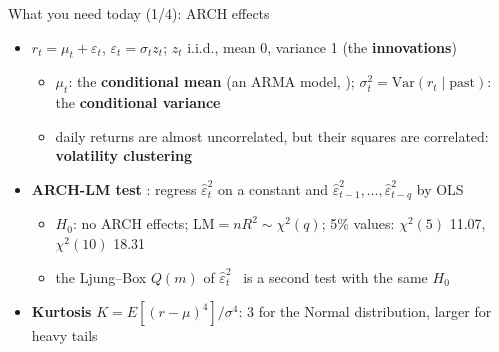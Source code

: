 \begin{frame}{What you need today (1/4): ARCH effects}
\itemsize{\small}
\begin{itemize}
    \item $r_t = \mu_t + \varepsilon_t$, $\varepsilon_t = \sigma_t z_t$; $z_t$ i.i.d., mean 0, variance 1 (the \textbf{innovations})
    \begin{itemize}
        \item $\mu_t$: the \textbf{conditional mean} (an ARMA model, ); $\sigma_t^2 = \mathrm{Var}(r_t \mid \text{past})$: the \textbf{conditional variance}
        \item daily returns are almost uncorrelated, but their squares are correlated: \textbf{volatility clustering}
    \end{itemize}
    \item \textbf{ARCH-LM test} : regress $\hat\varepsilon_t^2$ on a constant and $\hat\varepsilon_{t-1}^2, \dots, \hat\varepsilon_{t-q}^2$ by OLS
    \begin{itemize}
        \item $H_0$: no ARCH effects; $\mathrm{LM} = nR^2 \sim \chi^2(q)$; 5\% values: $\chi^2(5)$ 11.07, $\chi^2(10)$ 18.31
        \item the Ljung--Box $Q(m)$ of $\hat\varepsilon_t^2$ \ is a second test with the same $H_0$
    \end{itemize}
    \item \textbf{Kurtosis} $K = E[(r - \mu)^4]/\sigma^4$: 3 for the Normal distribution, larger for heavy tails
\end{itemize}
\end{frame}

